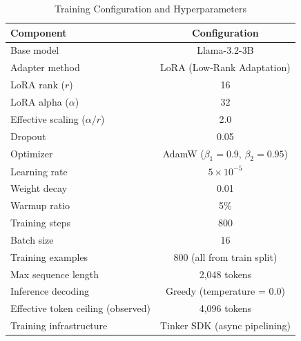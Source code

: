 \begin{table}[h!]
\centering
\caption{Training Configuration and Hyperparameters}
\label{tab:training_config}
\begin{tabular}{lc}
\toprule
\textbf{Component} & \textbf{Configuration} \\
\midrule
Base model & Llama-3.2-3B \\
Adapter method & LoRA (Low-Rank Adaptation) \\
LoRA rank ($r$) & 16 \\
LoRA alpha ($\alpha$) & 32 \\
Effective scaling ($\alpha / r$) & 2.0 \\
Dropout & 0.05 \\
Optimizer & AdamW ($\beta_1 = 0.9$, $\beta_2 = 0.95$) \\
Learning rate & $5 \times 10^{-5}$ \\
Weight decay & 0.01 \\
Warmup ratio & 5\% \\
Training steps & 800 \\
Batch size & 16 \\
Training examples & 800 (all from train split) \\
Max sequence length & 2{,}048 tokens \\
Inference decoding & Greedy (temperature = 0.0) \\
Effective token ceiling (observed) & 4{,}096 tokens \\
Training infrastructure & Tinker SDK (async pipelining) \\
\bottomrule
\end{tabular}
\end{table}
